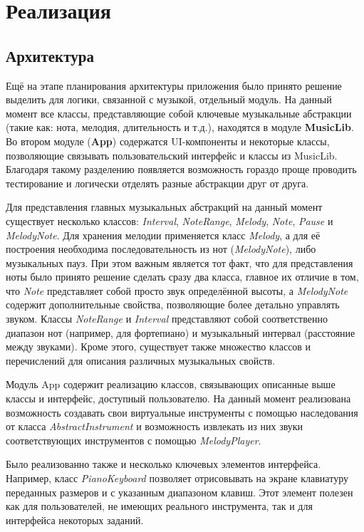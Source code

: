 \chapter{Реализация}
\section{Архитектура}
Ещё на этапе планирования архитектуры приложения было принято решение выделить для логики, связанной с музыкой, отдельный модуль. На данный момент все классы, представляющие собой ключевые музыкальные абстракции (такие как: нота, мелодия, длительность и т.д.), находятся в модуле \textbf{MusicLib}. Во втором модуле (\textbf{App}) содержатся UI-компоненты и некоторые классы, позволяющие связывать пользовательский интерфейс и классы из MusicLib. Благодаря такому разделению появляется возможность гораздо проще проводить тестирование и логически отделять разные абстракции друг от друга.\par
Для представления главных музыкальных абстракций на данный момент существует несколько классов: \textit{Interval}, \textit{NoteRange}, \textit{Melody}, \textit{Note}, \textit{Pause} и \textit{MelodyNote}. Для хранения мелодии применяется класс \textit{Melody}, а для её построения необходима последовательность из нот (\textit{MelodyNote}), либо музыкальных пауз. При этом важным является тот факт, что для представления ноты было принято решение сделать сразу два класса, главное их отличие в том, что \textit{Note} представляет собой просто звук определённой высоты, а \textit{MelodyNote} содержит дополнительные свойства, позволяющие более детально управлять звуком. Классы \textit{NoteRange} и \textit{Interval} представляют собой соответственно диапазон нот (например, для фортепиано) и музыкальный интервал (расстояние между звуками). Кроме этого, существует также множество классов и перечислений для описания различных музыкальных свойств.\par
Модуль App содержит реализацию классов, связывающих описанные выше классы и интерфейс, доступный пользователю. На данный момент реализована возможность создавать свои виртуальные инструменты с помощью наследования от класса \textit{AbstractInstrument} и возможность извлекать из них звуки соответствующих инструментов с помощью \textit{MelodyPlayer}.\par
Было реализованно также и несколько ключевых элементов интерфейса. Например, класс \textit{PianoKeyboard} позволяет отрисовывать на экране клавиатуру переданных размеров и с указанным диапазоном клавиш. Этот элемент полезен как для пользователей, не имеющих реального инструмента, так и для интерфейса некоторых заданий.

